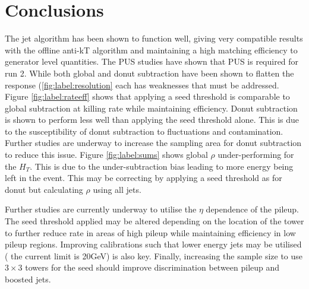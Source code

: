 \section{Conclusions}
The jet algorithm has been shown to function well, giving very compatible results with the offline anti-kT algorithm and maintaining a high matching efficiency to generator level quantities. The PUS studies have shown that PUS is required for run 2. While both global and donut subtraction have been shown to flatten the response (\ref{fig:label:resolution} each has weaknesses that must be addressed. Figure \ref{fig:label:rateeff} shows that applying a seed threshold is comparable to global subtraction at killing rate while maintaining efficiency. Donut subtraction is shown to perform less well than applying the seed threshold alone. This is due to the susceptibility of donut subtraction to fluctuations and contamination. Further studies are underway to increase the sampling area for donut subtraction to reduce this issue. Figure \ref{fig:label:sums} shows global $\rho$ under-performing for the $H_T$. This is due to the under-subtraction bias leading to more energy being left in the event. This may be correcting by applying a seed threshold as for donut but calculating $\rho$ using all jets. 

Further studies are currently underway to utilise the $\eta$ dependence of the pileup.  The seed threshold applied may be altered depending on the location of the tower to further reduce rate in areas of high pileup while maintaining efficiency in low pileup regions. Improving calibrations such that lower energy jets may be utilised ( the current limit is 20GeV) is also key. Finally, increasing the sample size to use $3\times3$ towers for the seed should improve discrimination between pileup and boosted jets. 

    
